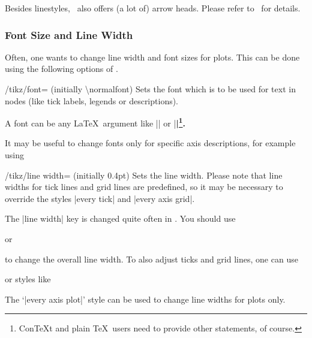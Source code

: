 Besides linestyles, \PGF\ also offers (a lot of) arrow heads. Please refer to~\cite{tikz} for details.
\endgroup


\subsubsection{Font Size and Line Width}
Often, one wants to change line width and font sizes for plots. This can be done using the following options of \Tikz.

\begin{key}{/tikz/font= (initially \textbackslash normalfont)}
	Sets the font which is to be used for text in nodes (like tick labels, legends or descriptions).

	A font can be any \LaTeX\ argument like |\footnotesize| or |\small\bfseries|\footnote{Con\TeX t and plain \TeX\ users need to provide other statements, of course.}.

	It may be useful to change fonts only for specific axis descriptions, for example using
\begin{codeexample}
\end{codeexample}
\end{key}

\begin{key}{/tikz/line width= (initially 0.4pt)}
	Sets the line width. Please note that line widths for tick lines and grid lines are predefined, so it may be necessary to override the styles |every tick| and |every axis grid|.

	The |line width| key is changed quite often in \Tikz. You should use
\begin{codeexample}
\end{codeexample}
	or
\begin{codeexample}
\end{codeexample}
	to change the overall line width. To also adjust ticks and grid lines, one can use
\begin{codeexample}
\end{codeexample}
	or styles like
\begin{codeexample}
\end{codeexample}
	The `|every axis plot|' style can be used to change line widths for plots only.
\end{key}

